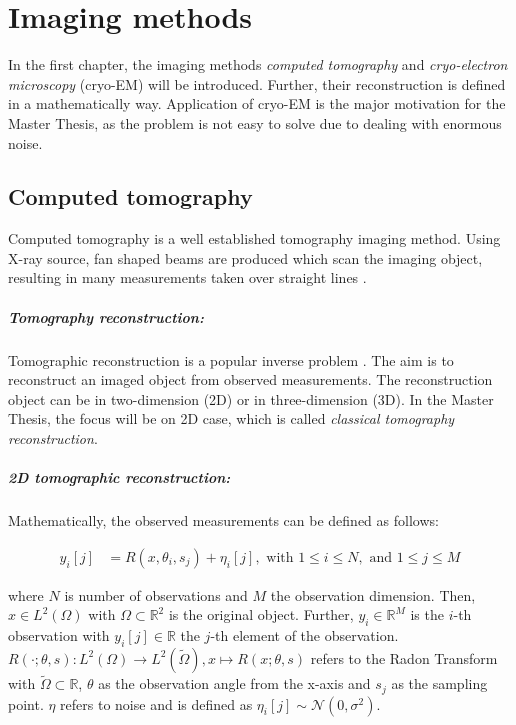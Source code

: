 \chapter{Imaging methods}
\label{sec:imaging}

In the first chapter, the imaging methods \textit{computed tomography} and 
\textit{cryo-electron microscopy} (cryo-EM) will be introduced. 
Further, their reconstruction is defined in a mathematically way.
Application of cryo-EM is the major motivation for the Master Thesis, 
as the problem is not easy to solve due to dealing with enormous noise.


\section{Computed tomography}
Computed tomography is a well established tomography imaging method.
Using X-ray source, fan shaped beams are produced which scan the imaging object,
resulting in many measurements taken over straight lines \cite{computedTomography}.

\paragraph{Tomography reconstruction:}
Tomographic reconstruction\cite{tomographicReconstruction} is a popular inverse problem \cite{tomographicReconstruction}. 
The aim is to reconstruct an imaged object from observed measurements.
The reconstruction object can be in two-dimension (2D) or in three-dimension (3D). 
In the Master Thesis, the focus will be on 2D case, which is called \textit{classical tomography reconstruction}.

\paragraph{2D tomographic reconstruction:}

Mathematically, the observed measurements can be defined as follows:

\begin{equation}
    \label{eq:2Dreconstruction}
    \begin{aligned}
        y_i[j] &= R(x, \theta_i, s_j) + \eta_i[j] , \text{ with } 1 \leq i \leq N, \text{ and } 1 \leq j \leq M
    \end{aligned}
\end{equation}

where $N$ is number of observations and $M$ the observation dimension.
Then, $x \in L^2(\Omega)$ with $\Omega \subset \mathbb{R}^2 $ is the original object.
Further, $y_i \in \mathbb{R}^M$ is the $i$-th observation with $y_i[j] \in \mathbb{R}$ the $j$-th element of the observation.
$R(\cdot; \theta, s): L^2(\Omega) \to L^2(\tilde{\Omega}) , x \mapsto R(x; \theta,s)$ refers to the Radon Transform
with $\tilde{\Omega} \subset \mathbb{R}$, $\theta$ as the observation angle from the x-axis and $s_j$ as the sampling point.
$\eta$ refers to noise and is defined as $\eta_i[j] \sim \mathcal{N}(0,\sigma^2)$.

